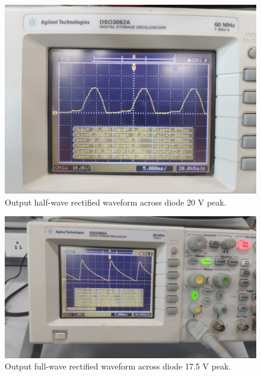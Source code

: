 \documentclass[journal,12pt,twocolumn]{IEEEtran}
\begin{document}
	
	\begin{figure}[!ht]
		\includegraphics[width=\columnwidth]{figs/c_2.jpg}
		\caption{Output half-wave rectified waveform across diode 20 V peak.}
		\label{fig:hwrect}
	\end{figure}
	\begin{figure}[!ht]
		\includegraphics[width=\columnwidth]{figs/c_3.jpg}
		\caption{Output full-wave rectified waveform across diode 17.5 V peak.}
		\label{fig:rectifier}
	\end{figure}
	
\end{document}
